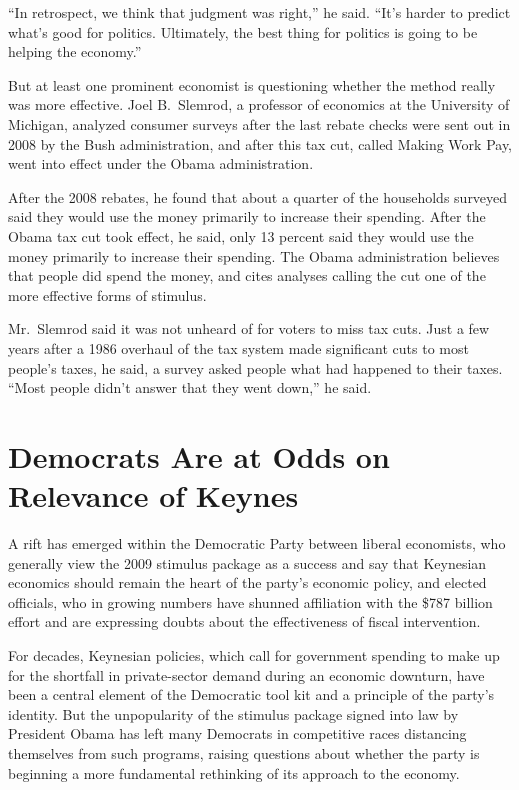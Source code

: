 ﻿\documentclass[12pt]{article}
\begin{document}
``In retrospect, we think that judgment was right,'' he said. ``It's harder to predict what's good
for politics. Ultimately, the best thing for politics is going to be helping the economy.''

But at least one prominent economist is questioning whether the method really was more effective.
Joel B.~Slemrod, a professor of economics at the University of Michigan, analyzed consumer surveys
after the last rebate checks were sent out in 2008 by the Bush administration, and after this tax
cut, called Making Work Pay, went into effect under the Obama administration.

After the 2008 rebates, he found that about a quarter of the households surveyed said they would use
the money primarily to increase their spending. After the Obama tax cut took effect, he said, only
13 percent said they would use the money primarily to increase their spending. The Obama
administration believes that people did spend the money, and cites analyses calling the cut one of
the more effective forms of stimulus.

Mr.~Slemrod said it was not unheard of for voters to miss tax cuts. Just a few years after a 1986
overhaul of the tax system made significant cuts to most people's taxes, he said, a survey asked
people what had happened to their taxes. ``Most people didn't answer that they went down,'' he said.

\section{Democrats Are at Odds on Relevance of Keynes}

\lettrine{A}{} rift has emerged within the Democratic Party between liberal
economists, who generally view the 2009 stimulus package as a success and say that Keynesian
economics should remain the heart of the party's economic policy, and elected officials, who in
growing numbers have shunned affiliation with the \$787 billion effort and are expressing doubts
about the effectiveness of fiscal intervention.

For decades, Keynesian policies, which call for government spending to make up for the shortfall in
private-sector demand during an economic downturn, have been a central element of the Democratic
tool kit and a principle of the party's identity. But the unpopularity of the stimulus package
signed into law by President Obama has left many Democrats in competitive races distancing
themselves from such programs, raising questions about whether the party is beginning a more
fundamental rethinking of its approach to the economy.
\end{document}
